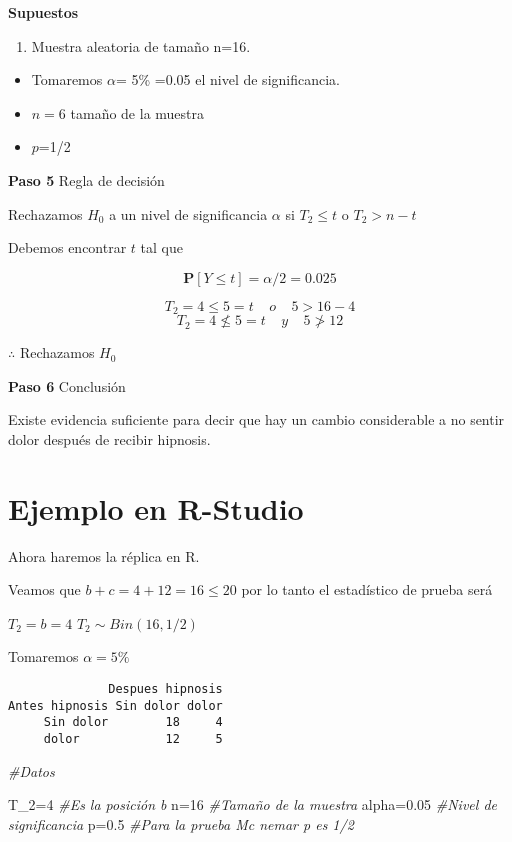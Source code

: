 \documentclass[
  a4paper,
  oneside,
  openany]{book}
\newenvironment{Shaded}{\begin{snugshade}}{\end{snugshade}}
\newcommand{\CommentTok}[1]{\textcolor[rgb]{0.56,0.35,0.01}{\textit{#1}}}
\newcommand{\DecValTok}[1]{\textcolor[rgb]{0.00,0.00,0.81}{#1}}
\newcommand{\FloatTok}[1]{\textcolor[rgb]{0.00,0.00,0.81}{#1}}
\newcommand{\NormalTok}[1]{#1}
\providecommand{\tightlist}{%
  \setlength{\itemsep}{0pt}\setlength{\parskip}{0pt}}
\begin{document}
\textbf{Supuestos}

\begin{enumerate}
\def\labelenumi{\arabic{enumi}.}
\tightlist
\item
  Muestra aleatoria de tamaño n=16.
\end{enumerate}

\begin{itemize}
\item
  Tomaremos \(\alpha\)= 5\% =0.05 el nivel de significancia.
\item
  \(n=6\) tamaño de la muestra
\item
  \(p\)=1/2
\end{itemize}

\textbf{Paso 5} Regla de decisión

Rechazamos \(H_0\) a un nivel de significancia \(\alpha\) si \(T_{2} \leq t\) o \(T_{2}>n-t\)

Debemos encontrar \(t\) tal que

\[\mathbf{P}[Y \leq t]=\alpha/2=0.025\]

\[T_{2}=4 \leq 5=t  \ \ \ \ \   o  \ \ \ \ \      5>16-4  \]
\[T_{2}=4 \nleq 5=t   \ \ \ \ \   y   \ \ \ \ \      5\ngtr12\]

\(\therefore\) Rechazamos \(H_0\)

\textbf{Paso 6} Conclusión

Existe evidencia suficiente para decir que hay un cambio considerable a no sentir dolor después de recibir hipnosis.

\hypertarget{ejemplo-en-r-studio-3}{%
\section{Ejemplo en R-Studio}\label{ejemplo-en-r-studio-3}}

Ahora haremos la réplica en R.

Veamos que \(b+c=4+12=16\leq 20\) por lo tanto el estadístico de prueba será

\(T_2=b=4\)
\(T_2\sim Bin(16,1/2)\)

Tomaremos \(\alpha=5\%\)

\begin{verbatim}
              Despues hipnosis
Antes hipnosis Sin dolor dolor
     Sin dolor        18     4
     dolor            12     5
\end{verbatim}

\begin{Shaded}
\begin{Highlighting}[]
\CommentTok{\#Datos}

\NormalTok{T\_}\DecValTok{2}\NormalTok{=}\DecValTok{4}                    \CommentTok{\#Es la posición b}
\NormalTok{n=}\DecValTok{16}                     \CommentTok{\#Tamaño de la muestra}
\NormalTok{alpha=}\FloatTok{0.05}               \CommentTok{\#Nivel de significancia}
\NormalTok{p=}\FloatTok{0.5}                    \CommentTok{\#Para la prueba Mc nemar p es 1/2}
\end{Highlighting}
\end{Shaded}
\end{document}
